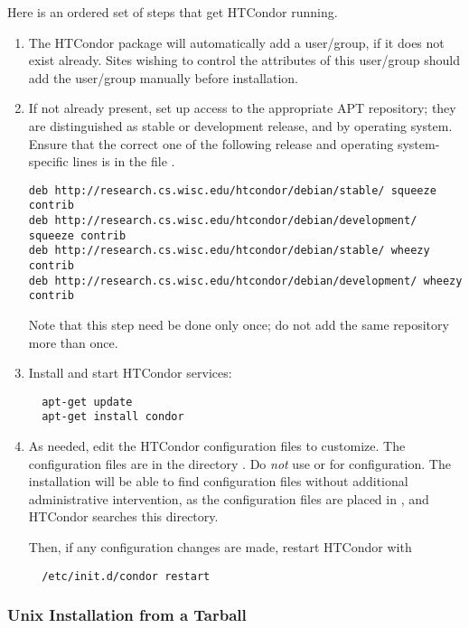 Here is an ordered set of steps that get HTCondor running.
\begin{enumerate}
\item The HTCondor package will automatically add a  user/group,
if it does not exist already.
Sites wishing to control the attributes of this user/group 
should add the  user/group manually before installation.

\item If not already present,
set up access to the appropriate APT repository;
they are distinguished as stable or development release,
and by operating system. 
Ensure that the correct one of the following release and 
operating system-specific lines is in 
the file  .
\footnotesize
\begin{verbatim}
deb http://research.cs.wisc.edu/htcondor/debian/stable/ squeeze contrib
deb http://research.cs.wisc.edu/htcondor/debian/development/ squeeze contrib
deb http://research.cs.wisc.edu/htcondor/debian/stable/ wheezy contrib
deb http://research.cs.wisc.edu/htcondor/debian/development/ wheezy contrib
\end{verbatim}
\normalsize
Note that this step need be done only once;
do not add the same repository more than once.

\item Install and start HTCondor services:
\begin{verbatim}
  apt-get update
  apt-get install condor
\end{verbatim}

\item As needed, edit the HTCondor configuration files to customize.
The configuration files are in the directory  .
Do \emph{not} use  or  for configuration.
The installation will be able to find configuration files without
additional administrative intervention,
as the configuration files are placed in ,
and HTCondor searches this directory.

Then, if any configuration changes are made, restart HTCondor with
\begin{verbatim}
  /etc/init.d/condor restart
\end{verbatim}

\end{enumerate}

\subsubsection{\label{sec:unix-install-from-tarball}
Unix Installation from a Tarball}

